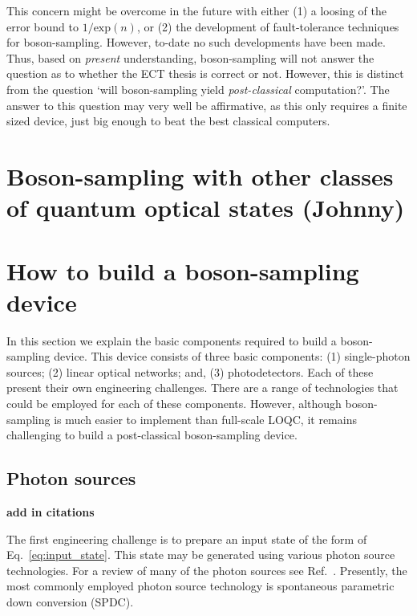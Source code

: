 \documentclass[aps,pra,twocolumn,amsmath,amssymb,nofootinbib,superscriptaddress]{revtex4}
\begin{document}
This concern might be overcome in the future with either (1) a loosing of the error bound to $1/\mathrm{exp}(n)$, or (2) the development of fault-tolerance techniques for boson-sampling. However, to-date no such developments have been made. Thus, based on \emph{present} understanding, boson-sampling will not answer the question as to whether the ECT thesis is correct or not. However, this is distinct from the question `will boson-sampling yield \emph{post-classical} computation?'. The answer to this question may very well be affirmative, as this only requires a finite sized device, just big enough to beat the best classical computers.

\section{Boson-sampling with other classes of quantum optical states (Johnny)}

\section{How to build a boson-sampling device}

In this section we explain the basic components required to build a boson-sampling device. This device consists of three basic components: (1) single-photon sources; (2) linear optical networks; and, (3) photodetectors. Each of these present their own engineering challenges. There are a range of technologies that could be employed for each of these components. However, although boson-sampling is much easier to implement than full-scale LOQC, it remains challenging to build a post-classical boson-sampling device. 

\subsection{Photon sources}

\textbf{add in citations}

The first engineering challenge is to prepare an input state of the form of Eq.~\ref{eq:input_state}. This state may be generated using various photon source technologies. For a review of many of the photon sources see Ref.~\cite{bib:SourceAndDetectorReview}. Presently, the most commonly employed photon source technology is spontaneous parametric down conversion (SPDC).
\end{document}
